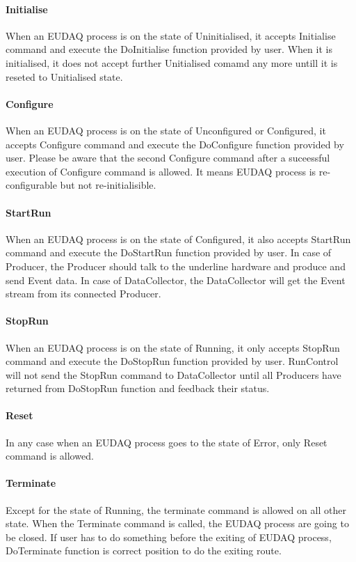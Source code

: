 \paragraph{Initialise}
When an EUDAQ process is on the state of Uninitialised, it accepts Initialise command and execute the DoInitialise function provided by user. When it is initialised, it does not accept further Unitialised comamd any more untill it is reseted to Unitialised state.

\paragraph{Configure}
When an EUDAQ process is on the state of Unconfigured or Configured, it accepts Configure command and execute the DoConfigure function provided by user. Please be aware that the second Configure command after a suceessful execution of Configure command is allowed. It means EUDAQ process is re-configurable but not re-initialisible.

\paragraph{StartRun}
When an EUDAQ process is on the state of Configured, it also accepts StartRun command and execute the DoStartRun function provided by user. In case of Producer, the Producer should talk to the underline hardware and produce and send Event data. In case of DataCollector, the DataCollector will get the Event stream from its connected Producer.

\paragraph{StopRun}
When an EUDAQ process is on the state of Running, it only accepts StopRun command and execute the DoStopRun function provided by user. RunControl will not send the StopRun command to DataCollector until all Producers have returned from DoStopRun function and feedback their status.

\paragraph{Reset}
In any case when an EUDAQ process goes to the state of Error, only Reset command is allowed.

\paragraph{Terminate}
Except for the state of Running, the terminate command is allowed on all other state. When the Terminate command is called, the EUDAQ process are going to be closed. If user has to do something before the exiting of EUDAQ process, DoTerminate function is correct position to do the exiting route.

